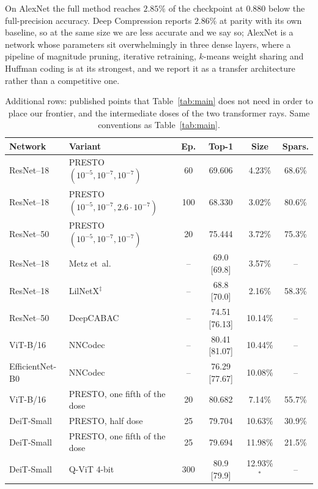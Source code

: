 \documentclass{article}
\begin{document}
On AlexNet the full method reaches $2.85\%$ of the checkpoint at $0.880$ below
the full-precision accuracy. Deep Compression \citep{han2016deep} reports
$2.86\%$ at parity with its own baseline, so at the same size we are less
accurate and we say so; AlexNet is a network whose parameters sit
overwhelmingly in three dense layers, where a pipeline of magnitude pruning,
iterative retraining, $k$-means weight sharing and Huffman coding is at its
strongest, and we report it as a transfer architecture rather than a competitive
one.

\begin{table}[ht]
  \caption{Additional rows: published points that Table~\ref{tab:main} does not
  need in order to place our frontier, and the intermediate doses of the two
  transformer rays. Same conventions as Table~\ref{tab:main}.}
  \label{tab:extra}
  \centering \scriptsize
  \setlength{\tabcolsep}{4pt}
  \begin{tabular}{llcccc}
    \toprule
    Network & Variant & Ep. & Top-1 & Size & Spars. \\
    \midrule
    ResNet--18 & PRESTO $(10^{-5},10^{-7},10^{-7})$ & 60 & 69.606 & 4.23\% & 68.6\% \\
    ResNet--18 & PRESTO $(10^{-5},10^{-7},2.6{\cdot}10^{-7})$ & 100 & 68.330 & 3.02\% & 80.6\% \\
    ResNet--50 & PRESTO $(10^{-5},10^{-7},10^{-7})$ & 20 & 75.444 & 3.72\% & 75.3\% \\
    ResNet--18 & Metz et~al. \citep{metz2024ans} & -- & 69.0 {\tiny[69.8]} & 3.57\% & -- \\
    ResNet--18 & LilNetX$^{\ddagger}$ \citep{girish2023lilnetx} & -- & 68.8 {\tiny[70.0]} & 2.16\% & 58.3\% \\
    ResNet--50 & DeepCABAC \citep{wiedemann2019deepcabac} & -- & 74.51 {\tiny[76.13]} & 10.14\% & -- \\
    ViT-B/16 & NNCodec \citep{becking2023nncodec} & -- & 80.41 {\tiny[81.07]} & 10.44\% & -- \\
    EfficientNet-B0 & NNCodec \citep{becking2023nncodec} & -- & 76.29 {\tiny[77.67]} & 10.08\% & -- \\
    ViT-B/16 & PRESTO, one fifth of the dose & 20 & 80.682 & 7.14\% & 55.7\% \\
    DeiT-Small & PRESTO, half dose & 25 & 79.704 & 10.63\% & 30.9\% \\
    DeiT-Small & PRESTO, one fifth of the dose & 25 & 79.694 & 11.98\% & 21.5\% \\
    DeiT-Small & Q-ViT 4-bit \citep{li2022qvit} & 300 & 80.9 {\tiny[79.9]} & 12.93\%$^{*}$ & -- \\
    \bottomrule
  \end{tabular}
\end{table}
\end{document}
